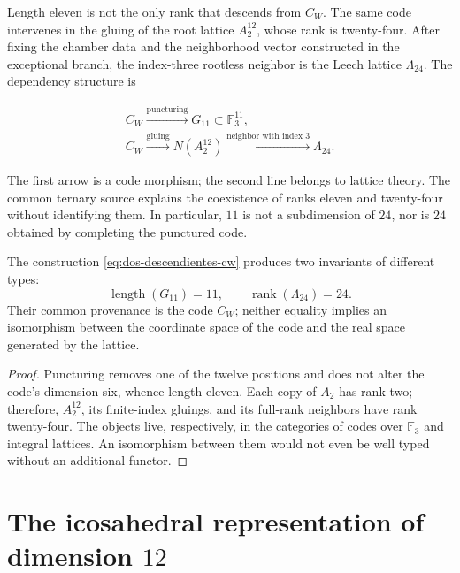 Length eleven is not the only rank that descends from \(C_W\). The same
code intervenes in the gluing of the root lattice \(A_2^{12}\), whose
rank is twenty-four. After fixing the chamber data and the neighborhood vector
constructed in the exceptional branch, the index-three rootless neighbor is the
Leech lattice \(\Lambda_{24}\). The dependency structure is

\begin{equation}
\label{eq:dos-descendientes-cw}
\begin{gathered}
C_W\xrightarrow{\text{puncturing}}G_{11}\subset\mathbb F_3^{11},\\[2mm]
C_W\xrightarrow{\text{gluing}}N(A_2^{12})
\xrightarrow{\text{neighbor with index }3}\Lambda_{24}.
\end{gathered}
\end{equation}

The first arrow is a code morphism; the second line belongs to
lattice theory. The common ternary source explains the coexistence of
ranks eleven and twenty-four without identifying them. In particular, \(11\) is not
a subdimension of \(24\), nor is \(24\) obtained by completing the
punctured code.

\begin{proposition}
The construction \eqref{eq:dos-descendientes-cw} produces two invariants of
different types:
\[
\operatorname{length}(G_{11})=11,
\qquad
\operatorname{rank}(\Lambda_{24})=24.
\]
Their common provenance is the code \(C_W\); neither equality
implies an isomorphism between the coordinate space of the code and the
real space generated by the lattice.
\end{proposition}

\begin{proof}
Puncturing removes one of the twelve positions and does not alter the code's
dimension six, whence length eleven. Each copy of \(A_2\) has rank
two; therefore, \(A_2^{12}\), its finite-index gluings, and its full-rank
neighbors have rank twenty-four. The objects live, respectively,
in the categories of codes over \(\mathbb F_3\) and integral lattices. An
isomorphism between them would not even be well typed without an additional
functor.
\end{proof}

\section{The icosahedral representation of dimension \(12\)}
\label{sec:representacion-a5-doce}


